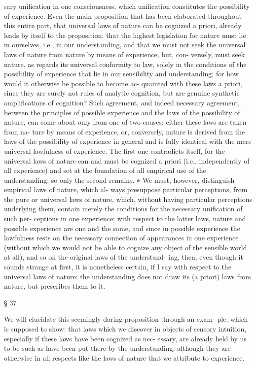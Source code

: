 sary uniﬁcation in one consciousness, which uniﬁcation constitutes the
possibility of experience.
Even the main proposition that has been elaborated throughout this
entire part, that universal laws of nature can be cognized a priori, already
leads by itself to the proposition: that the highest legislation for nature
must lie in ourselves, i.e., in our understanding, and that we must not seek
the universal laws of nature from nature by means of experience, but, con-
versely, must seek nature, as regards its universal conformity to law, solely
in the conditions of the possibility of experience that lie in our sensibility
and understanding; for how would it otherwise be possible to become ac-
quainted with these laws a priori, since they are surely not rules of analytic
cognition, but are genuine synthetic ampliﬁcations of cognition? Such
agreement, and indeed necessary agreement, between the principles of
possible experience and the laws of the possibility of nature, can come
about only from one of two causes: either these laws are taken from na-
ture by means of experience, or, conversely, nature is derived from the
laws of the possibility of experience in general and is fully identical with
the mere universal lawfulness of experience. The ﬁrst one contradicts
itself, for the universal laws of nature can and must be cognized a priori
(i.e., independently of all experience) and set at the foundation of all
empirical use of the understanding; so only the second remains. ∗
We must, however, distinguish empirical laws of nature, which al-
ways presuppose particular perceptions, from the pure or universal laws
of nature, which, without having particular perceptions underlying them,
contain merely the conditions for the necessary uniﬁcation of such per-
ceptions in one experience; with respect to the latter laws, nature and
possible experience are one and the same, and since in possible experience
the lawfulness rests on the necessary connection of appearances in one
experience (without which we would not be able to cognize any object of
the sensible world at all), and so on the original laws of the understand-
ing, then, even though it sounds strange at ﬁrst, it is nonetheless certain,
if I say with respect to the universal laws of nature: the understanding does
not draw its (a priori) laws from nature, but prescribes them to it.

§ 37

We will elucidate this seemingly daring proposition through an exam-
ple, which is supposed to show: that laws which we discover in objects
of sensory intuition, especially if these laws have been cognized as nec-
essary, are already held by us to be such as have been put there by the
understanding, although they are otherwise in all respects like the laws
of nature that we attribute to experience.

